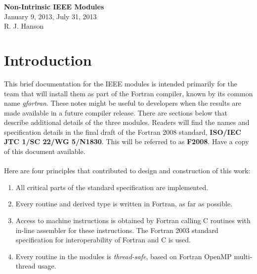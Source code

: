 \documentclass[12pt]{article}
\begin{document}

\pagestyle{fred}
\thispagestyle{empty}
\begin{center}
  {\LARGE \bf Non-Intrinsic IEEE Modules}
   \\[10pt]
  {\large January 9, 2013, July 31, 2013\\[5pt]
 R. J. Hanson}\vspace{10pt}
\end{center}

\begin{abstract}
  Three non-intrinsic Fortran 2003  modules are implemented.  These modules are IEEE\_FEATURES,  IEEE\_EXCEPTIONS, and IEEE\_ARITHMETIC.  All codes assume the underlying machine architecture
 is the Intel or AMD x86.  Machine instructions are used that have appeared since about 1999.
The module procedures call  C codes that use in-line assembler for  instructions that 
must maintain the flags, status,  and computation of the remainder function, IEEE\_REM.  
\end{abstract}

\tableofcontents

\section{Introduction}

This brief documentation for the IEEE modules is intended primarily for the team that will
install them as part of the Fortran compiler, known by its common name {\it gfortran}.
These notes might be useful to developers when the results are made available in a future compiler release.\newline
There are sections below that describe additional details of the three modules.  Readers
will find  the names and specification details in the final draft of the Fortran 2008 standard, {\bf ISO/IEC JTC 1/SC 22/WG 5/N1830}.  This will be referred to as {\bf F2008}.  Have a copy of this document available.\\ \\

Here are four principles that contributed to design and  construction of this work:
\begin{enumerate}
\item All  critical parts of the standard specification are implemented.
\item Every routine and derived type is written in Fortran, as far as possible.
\item Access to machine instructions is obtained by Fortran calling C routines with in-line
assembler for these instructions.
The Fortran 2003 standard specification  for interoperability of Fortran and C is used.
\item Every routine in the modules is {\it thread-safe}, based on Fortran OpenMP multi-thread usage.
\end{enumerate}
\end{document}
